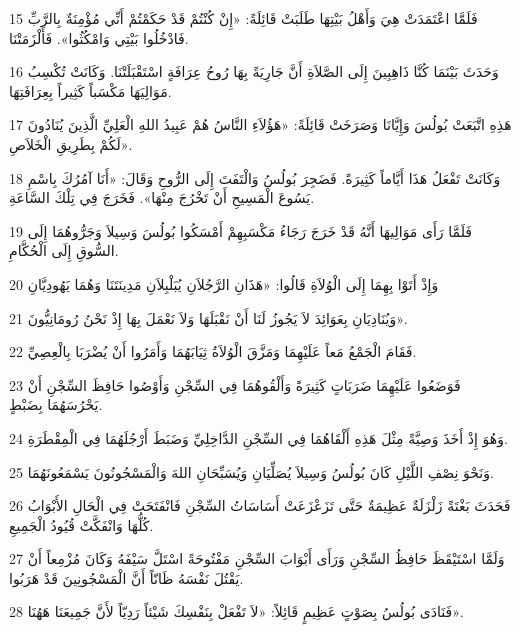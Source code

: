 \par 15 فَلَمَّا اعْتَمَدَتْ هِيَ وَأَهْلُ بَيْتِهَا طَلَبَتْ قَائِلَةً: «إِنْ كُنْتُمْ قَدْ حَكَمْتُمْ أَنِّي مُؤْمِنَةٌ بِالرَّبِّ فَادْخُلُوا بَيْتِي وَامْكُثُوا». فَأَلْزَمَتْنَا.
\par 16 وَحَدَثَ بَيْنَمَا كُنَّا ذَاهِبِينَ إِلَى الصَّلاَةِ أَنَّ جَارِيَةً بِهَا رُوحُ عِرَافَةٍ اسْتَقْبَلَتْنَا. وَكَانَتْ تُكْسِبُ مَوَالِيَهَا مَكْسَباً كَثِيراً بِعِرَافَتِهَا.
\par 17 هَذِهِ اتَّبَعَتْ بُولُسَ وَإِيَّانَا وَصَرَخَتْ قَائِلَةً: «هَؤُلاَءِ النَّاسُ هُمْ عَبِيدُ اللهِ الْعَلِيِّ الَّذِينَ يُنَادُونَ لَكُمْ بِطَرِيقِ الْخَلاَصِ».
\par 18 وَكَانَتْ تَفْعَلُ هَذَا أَيَّاماً كَثِيرَةً. فَضَجِرَ بُولُسُ وَالْتَفَتَ إِلَى الرُّوحِ وَقَالَ: «أَنَا آمُرُكَ بِاسْمِ يَسُوعَ الْمَسِيحِ أَنْ تَخْرُجَ مِنْهَا». فَخَرَجَ فِي تِلْكَ السَّاعَةِ.
\par 19 فَلَمَّا رَأَى مَوَالِيهَا أَنَّهُ قَدْ خَرَجَ رَجَاءُ مَكْسَبِهِمْ أَمْسَكُوا بُولُسَ وَسِيلاَ وَجَرُّوهُمَا إِلَى السُّوقِ إِلَى الْحُكَّامِ.
\par 20 وَإِذْ أَتَوْا بِهِمَا إِلَى الْوُلاَةِ قَالُوا: «هَذَانِ الرَّجُلاَنِ يُبَلْبِلاَنِ مَدِينَتَنَا وَهُمَا يَهُودِيَّانِ
\par 21 وَيُنَادِيَانِ بِعَوَائِدَ لاَ يَجُوزُ لَنَا أَنْ نَقْبَلَهَا وَلاَ نَعْمَلَ بِهَا إِذْ نَحْنُ رُومَانِيُّونَ».
\par 22 فَقَامَ الْجَمْعُ مَعاً عَلَيْهِمَا وَمَزَّقَ الْوُلاَةُ ثِيَابَهُمَا وَأَمَرُوا أَنْ يُضْرَبَا بِالْعِصِيِّ.
\par 23 فَوَضَعُوا عَلَيْهِمَا ضَرَبَاتٍ كَثِيرَةً وَأَلْقُوهُمَا فِي السِّجْنِ وَأَوْصُوا حَافِظَ السِّجْنِ أَنْ يَحْرُسَهُمَا بِضَبْطٍ.
\par 24 وَهُوَ إِذْ أَخَذَ وَصِيَّةً مِثْلَ هَذِهِ أَلْقَاهُمَا فِي السِّجْنِ الدَّاخِلِيِّ وَضَبَطَ أَرْجُلَهُمَا فِي الْمِقْطَرَةِ.
\par 25 وَنَحْوَ نِصْفِ اللَّيْلِ كَانَ بُولُسُ وَسِيلاَ يُصَلِّيَانِ وَيُسَبِّحَانِ اللهَ وَالْمَسْجُونُونَ يَسْمَعُونَهُمَا.
\par 26 فَحَدَثَ بَغْتَةً زَلْزَلَةٌ عَظِيمَةٌ حَتَّى تَزَعْزَعَتْ أَسَاسَاتُ السِّجْنِ فَانْفَتَحَتْ فِي الْحَالِ الأَبْوَابُ كُلُّهَا وَانْفَكَّتْ قُيُودُ الْجَمِيعِ.
\par 27 وَلَمَّا اسْتَيْقَظَ حَافِظُ السِّجْنِ وَرَأَى أَبْوَابَ السِّجْنِ مَفْتُوحَةً اسْتَلَّ سَيْفَهُ وَكَانَ مُزْمِعاً أَنْ يَقْتُلَ نَفْسَهُ ظَانّاً أَنَّ الْمَسْجُونِينَ قَدْ هَرَبُوا.
\par 28 فَنَادَى بُولُسُ بِصَوْتٍ عَظِيمٍ قَائِلاً: «لاَ تَفْعَلْ بِنَفْسِكَ شَيْئاً رَدِيّاً لأَنَّ جَمِيعَنَا هَهُنَا».
